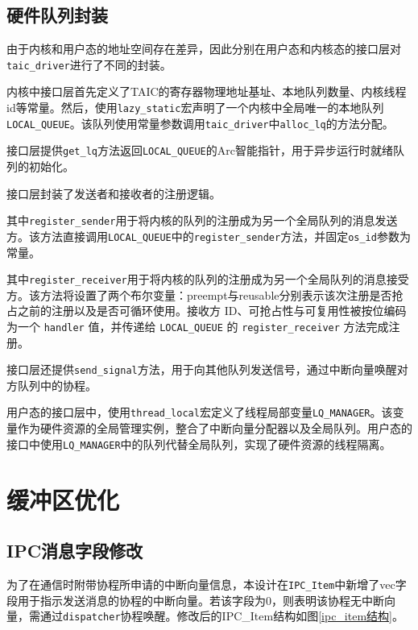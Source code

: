 \subsection{硬件队列封装}

由于内核和用户态的地址空间存在差异，因此分别在用户态和内核态的接口层对\texttt{taic\_driver}进行了不同的封装。

内核中接口层首先定义了TAIC的寄存器物理地址基址、本地队列数量、内核线程id等常量。然后，使用\texttt{lazy\_static}宏声明了一个内核中全局唯一的本地队列\texttt{LOCAL\_QUEUE}。该队列使用常量参数调用\texttt{taic\_driver}中\texttt{alloc\_lq}的方法分配。

接口层提供\texttt{get\_lq}方法返回\texttt{LOCAL\_QUEUE}的Arc智能指针，用于异步运行时就绪队列的初始化。

接口层封装了发送者和接收者的注册逻辑。

其中\texttt{register\_sender}用于将内核的队列的注册成为另一个全局队列的消息发送方。该方法直接调用\texttt{LOCAL\_QUEUE}中的\texttt{register\_sender}方法，并固定\texttt{os\_id}参数为常量。

其中\texttt{register\_receiver}用于将内核的队列的注册成为另一个全局队列的消息接受方。该方法将设置了两个布尔变量：preempt与reusable分别表示该次注册是否抢占之前的注册以及是否可循环使用。接收方 ID、可抢占性与可复用性被按位编码为一个 \texttt{handler} 值，并传递给 \texttt{LOCAL\_QUEUE} 的 \texttt{register\_receiver} 方法完成注册。

接口层还提供\texttt{send\_signal}方法，用于向其他队列发送信号，通过中断向量唤醒对方队列中的协程。

用户态的接口层中，使用\texttt{thread\_local}宏定义了线程局部变量\texttt{LQ\_MANAGER}。该变量作为硬件资源的全局管理实例，整合了中断向量分配器以及全局队列。用户态的接口中使用\texttt{LQ\_MANAGER}中的队列代替全局队列，实现了硬件资源的线程隔离。

\section{缓冲区优化}

\subsection{IPC消息字段修改}

为了在通信时附带协程所申请的中断向量信息，本设计在\texttt{IPC\_Item}中新增了vec字段用于指示发送消息的协程的中断向量。若该字段为0，则表明该协程无中断向量，需通过\texttt{dispatcher}协程唤醒。修改后的IPC\_Item结构如图\ref{ipc_item结构}。

